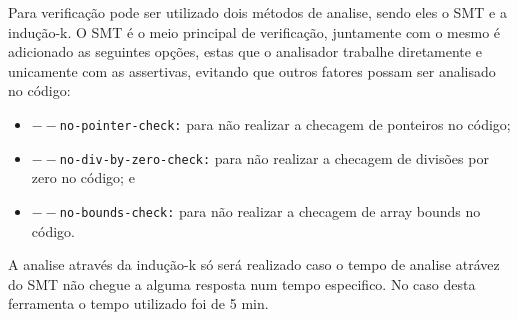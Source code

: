\par
Para verificação pode ser utilizado dois métodos de analise, sendo eles o SMT e a indução-k. O SMT é o meio principal de verificação, juntamente com o mesmo é adicionado as seguintes opções, estas que o analisador trabalhe diretamente e unicamente com as assertivas, evitando que outros fatores possam ser analisado no código:
\begin{itemize}
    \item \texttt{$--$no-pointer-check:} para não realizar a checagem de ponteiros no código;
    \item \texttt{$--$no-div-by-zero-check:} para não realizar a checagem de divisões por zero no código; e
    \item \texttt{$--$no-bounds-check:} para não realizar a checagem de array bounds no código.
\end{itemize}

\par
A analise através da indução-k só será realizado caso o tempo de analise atrávez do SMT não chegue a alguma resposta num tempo especifico. No caso desta ferramenta o tempo utilizado foi de 5 min.



